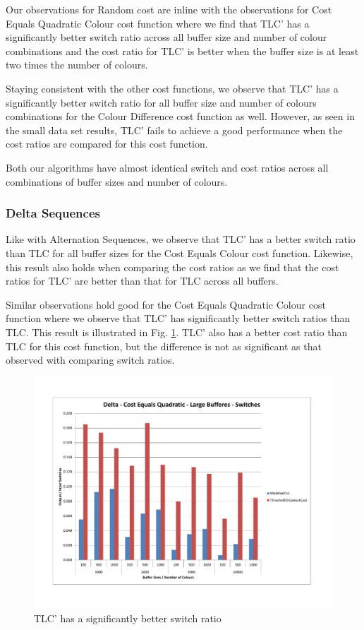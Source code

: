 Our observations for Random cost are inline with the observations for Cost Equals Quadratic Colour cost function where we find that TLC' has a significantly better switch ratio across all buffer size and number of colour combinations and the cost ratio for TLC' is better when the buffer size is at least two times the number of colours. 

Staying consistent with the other cost functions, we observe that TLC' has a significantly better switch ratio for all buffer size and number of colours combinations for the Colour Difference cost function as well. However, as seen in the small data set results, TLC' fails to achieve a good performance when the cost ratios are compared for this cost function. 

Both our algorithms have almost identical switch and cost ratios across all combinations of buffer sizes and number of colours. 

\subsubsection{Delta Sequences}

Like with Alternation Sequences, we observe that TLC' has a better switch ratio than TLC for all buffer sizes for the Cost Equals Colour cost function. Likewise, this result also holds when comparing the cost ratios as we find that the cost ratios for TLC' are better than that for TLC across all buffers. 

Similar observations hold good for the Cost Equals Quadratic Colour cost function where we observe that TLC' has significantly better switch ratios than TLC. This result is illustrated in Fig. \ref{deltaCQLargeSwitches}. TLC' also has a better cost ratio than TLC for this cost function, but the difference is not as significant as that observed with comparing switch ratios. 

\begin{figure}[ht]
\centering 
\includegraphics[scale=0.60]{Delta-cq-large-switches.pdf}
\caption{TLC' has a significantly better switch ratio}
\label{deltaCQLargeSwitches}
\end{figure}   

